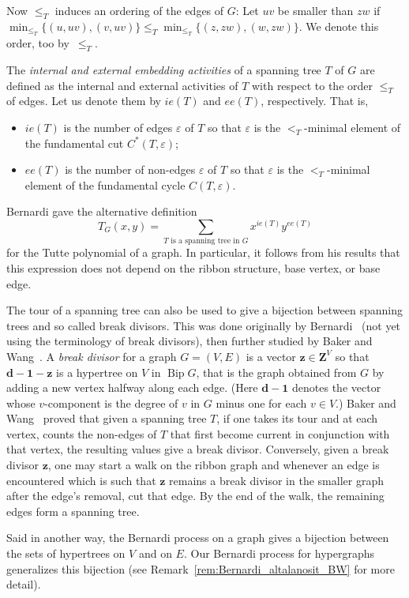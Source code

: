 \documentclass[ALCO,ThmDefs,Unicode,epreuves]{cedram}
\newcommand{\Z}{\mathbf{Z}}
\DeclareMathOperator{\bip}{Bip}
\begin{document}
Now $\leq_T$ induces an ordering of the edges of $G$: Let $uv$ be smaller than $zw$ if $\min_{\leq_T}\{(u,uv),(v,uv)\}\leq_T \min_{\leq_T}\{(z,zw),(w,zw)\}$. We denote this order, too by~$\leq_T$.

The \emph{internal and external embedding activities} of a spanning tree $T$ of $G$ are defined as the internal and external activities of $T$ with respect to the order $\leq_T$ of edges. Let us denote them by $ie(T)$ and $ee(T)$, respectively. That is,
\begin{itemize}
\item $ie(T)$ is the number of edges $\varepsilon$ of $T$ so that $\varepsilon$ is the $<_T$-minimal element of the fundamental cut $C^*(T,\varepsilon)$;
\item $ee(T)$ is the number of non-edges $\varepsilon$ of $T$ so that $\varepsilon$ is the $<_T$-minimal element of the fundamental cycle $C(T,\varepsilon)$.
\end{itemize}
Bernardi gave the alternative definition
\[T_G(x,y)=\sum_{T \text{ is a spanning tree in }G} x^{ie(T)}y^{ee(T)}\]
for the Tutte polynomial of a graph. In particular, it follows from his results that this expression does not depend on the ribbon structure, base vertex, or base edge.

The tour of a spanning tree can also be used to give a bijection between spanning trees and so called break divisors. This was done originally by Bernardi~\cite{Bernardi_first} (not yet using the terminology of break divisors), then further studied by Baker and Wang~\cite{Baker-Wang}. A \emph{break divisor} for a graph $G=(V,E)$ is a vector $\mathbf z\in\Z^V$ so that $\mathbf{d}-\mathbf{1}-\mathbf z$ is a hypertree on $V$ in $\bip G$, that is the graph obtained from $G$ by adding a new vertex halfway along each edge. (Here $\mathbf{d}-\mathbf{1}$ denotes the vector whose $v$-component is the degree of $v$ in $G$ minus one for each $v\in V$.) Baker and Wang~\cite{Baker-Wang} proved that given a spanning tree $T$, if one takes its tour and at each vertex, counts the non-edges of $T$ that first become current in conjunction with that vertex, the resulting values give a break divisor. Conversely, given a break divisor $\mathbf z$, one may start a walk on the ribbon graph and whenever an edge is encountered which is such that $\mathbf z$ remains a break divisor in the smaller graph after the edge's removal, cut that edge. By the end of the walk, the remaining edges form a spanning tree.

Said in another way, the Bernardi process on a graph gives a bijection between the sets of hypertrees on $V$ and on $E$. Our Bernardi process for hypergraphs generalizes this bijection (see Remark~\ref{rem:Bernardi_altalanosit_BW} for more detail).
\end{document}
